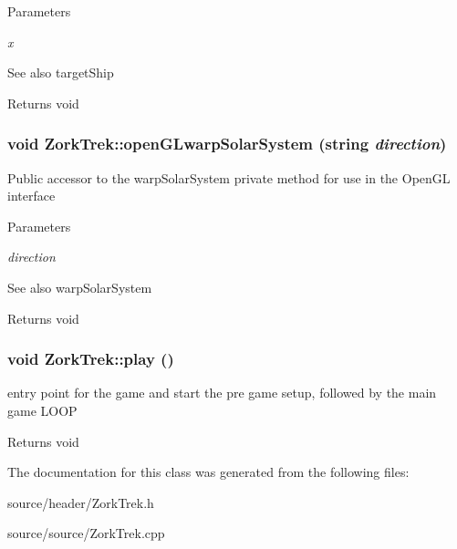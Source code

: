\begin{DoxyParams}{Parameters}
\item[{\em x}]\end{DoxyParams}
\begin{DoxySeeAlso}{See also}
targetShip
\end{DoxySeeAlso}
\begin{DoxyReturn}{Returns}
void 
\end{DoxyReturn}
\hypertarget{classZorkTrek_ae7119994598bbf87319c33e10a5762b4}{
\subsubsection[{openGLwarpSolarSystem}]{\setlength{\rightskip}{0pt plus 5cm}void ZorkTrek::openGLwarpSolarSystem (string {\em direction})}}
\label{d6/df9/classZorkTrek_ae7119994598bbf87319c33e10a5762b4}
Public accessor to the warpSolarSystem private method for use in the OpenGL interface


\begin{DoxyParams}{Parameters}
\item[{\em direction}]\end{DoxyParams}
\begin{DoxySeeAlso}{See also}
warpSolarSystem
\end{DoxySeeAlso}
\begin{DoxyReturn}{Returns}
void 
\end{DoxyReturn}
\hypertarget{classZorkTrek_aee046c36289fb0c839b58f55f4b786d5}{
\subsubsection[{play}]{\setlength{\rightskip}{0pt plus 5cm}void ZorkTrek::play ()}}
\label{d6/df9/classZorkTrek_aee046c36289fb0c839b58f55f4b786d5}
entry point for the game and start the pre game setup, followed by the main game LOOP

\begin{DoxyReturn}{Returns}
void 
\end{DoxyReturn}


The documentation for this class was generated from the following files:\begin{DoxyCompactItemize}
\item 
source/header/ZorkTrek.h\item 
source/source/ZorkTrek.cpp\end{DoxyCompactItemize}
